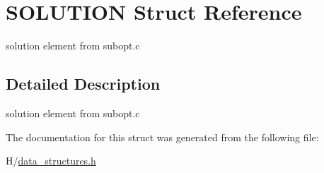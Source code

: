 \hypertarget{structSOLUTION}{
\section{SOLUTION Struct Reference}
\label{structSOLUTION}
}


solution element from subopt.c  




\subsection{Detailed Description}
solution element from subopt.c 

The documentation for this struct was generated from the following file:\begin{DoxyCompactItemize}
\item 
H/\hyperlink{data__structures_8h}{data\_\-structures.h}\end{DoxyCompactItemize}
